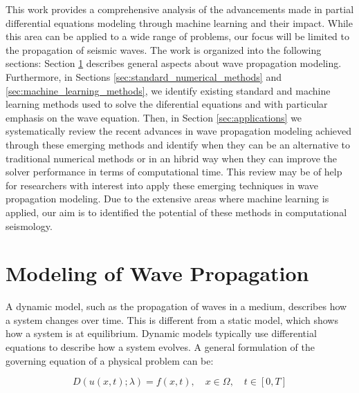 \documentclass[11pt,twoside]{article}
\begin{document}
This work provides a comprehensive analysis of the advancements made in partial differential equations modeling 
through machine learning and their impact. While this area can be applied to a wide range of problems, our focus 
will be limited to the propagation of seismic waves. The work is organized into the following sections: Section 
\ref{sec:modeling_wave_propagation} describes general aspects about wave propagation modeling. Furthermore, 
in Sections \ref{sec:standard_numerical_methods} and \ref{sec:machine_learning_methods}, we identify 
existing standard and machine learning methods used to solve the diferential equations and with particular emphasis 
on the wave equation. Then, in Section \ref{sec:applications} we systematically review the recent advances in wave 
propagation modeling achieved through these emerging methods and identify when they can be an alternative to 
traditional numerical methods or in an hibrid way when they can improve the solver performance in terms of 
computational time. This review may be of help for researchers with interest into apply 
these emerging techniques in wave propagation modeling. Due to the extensive areas where machine learning is 
applied, our aim is to identified the potential of these methods in computational seismology.

\section{Modeling of Wave Propagation}\label{sec:modeling_wave_propagation}

A dynamic model, such as the propagation of waves in a medium, describes how a system changes over time. This is 
different from a static model, which shows how a system is at equilibrium. Dynamic models typically use differential 
equations to describe how a system evolves. A general formulation of the governing equation of a physical problem can be:

\begin{equation*}
D(u(x,t); \lambda) = f(x,t), \quad x \in \Omega, \quad t \in [0, T]\label{eq:pde}
\end{equation*}
 
\end{document}
